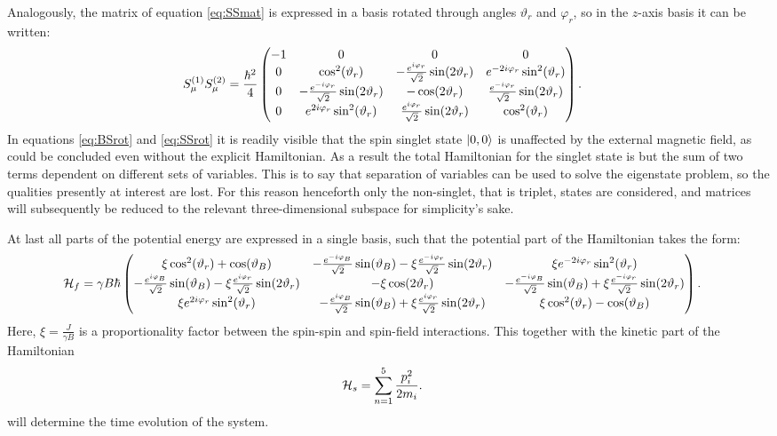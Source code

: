 \documentclass[a4paper]{article}
\begin{document}
Analogously, the matrix of equation \ref{eq:SSmat} is expressed in a basis rotated through
angles \(\vartheta_r\) and \(\varphi_r\), so in the \(z\)-axis basis it can be written:
\begin{align}\label{eq:SSrot}
        S^{(1)}_\mu S^{(2)}_\mu &= \frac{\hbar{}^2}{4}\pmqty{-1 & 0 & 0 & 0\\
                0 & \cos[2](\vartheta_r) & -\frac{e^{i\varphi_r}}{\sqrt{2}
                }\sin(2\vartheta_r) & e^{-2i\varphi_r}\sin[2](\vartheta_r)\\
                0 & -\frac{e^{-i\varphi_r}}{\sqrt{2}
                }\sin(2\vartheta_r) & -\cos(2\vartheta_r) & \frac{e^{-i\varphi_r}}{\sqrt{2}
        }\sin(2\vartheta_r)\\
        0 & e^{2i\varphi_r}\sin[2](\vartheta_r) & \frac{e^{i\varphi_r}}{\sqrt{2}
        }\sin(2\vartheta_r) & \cos[2](\vartheta_r)}
.\end{align}
In equations \ref{eq:BSrot} and \ref{eq:SSrot} it is readily visible that the spin singlet state \(\ket{0, 0}\) is unaffected by
the external magnetic field, as could be concluded even without the explicit Hamiltonian.
As a result the total Hamiltonian for the singlet state is but the sum of two terms
dependent on different sets of variables. This is to say that separation of variables can
be used to solve the eigenstate problem, so the qualities presently at interest are lost.
For this reason henceforth only the non-singlet, that is triplet, states are considered,
and matrices will subsequently be reduced to the relevant three-dimensional subspace for
simplicity's sake.

At last all parts of the potential energy are expressed in a single basis, such that the
potential part of the Hamiltonian takes the form:
\begin{align}\label{eq:Hf}
        \mathbb{\cal H}_f &= \gamma B \hbar{} \pmqty{
                 \xi\cos[2](\vartheta_r) + \cos(\vartheta_B)& -\frac{
                        e^{-i\varphi_B}}{\sqrt{2}
                }\sin(\vartheta_B) - \xi\frac{e^{-i\varphi_r}}{\sqrt{2} }\sin(2\vartheta_r) &
                \xi e^{-2i\varphi_r}\sin[2](\vartheta_r)\\
                 -\frac{e^{i\varphi_B}}{\sqrt{2}}\sin(\vartheta_B) -
                \xi \frac{e^{i\varphi_r}}{\sqrt{2} }\sin(2\vartheta_r) &
                -\xi\cos(2\vartheta_r) & -\frac{
                e^{-i\varphi_B}}{\sqrt{2} }\sin(\vartheta_B)+ \xi\frac{e^{-i\varphi_r}}{\sqrt{2}
        }\sin(2\vartheta_r)\\
                \xi e^{2i\varphi_r}\sin[2](\vartheta_r) & -\frac{
                e^{i\varphi_B}}{\sqrt{2} }\sin(\vartheta_B) +
                        \xi \frac{e^{i\varphi_r}}{\sqrt{2} }\sin(2\vartheta_r) &
                        \xi \cos[2](\vartheta_r) - \cos(\vartheta_B) 
        }
.\end{align}
Here, \(\xi = \frac{J}{\gamma B}\) is a proportionality factor between the spin-spin
and spin-field interactions. This together with the
kinetic part of the Hamiltonian
\begin{align}\label{eq:Hs}
        \mathbb{\cal H}_s &= \sum_{n=1}^{5} \frac{p_i^2}{2m_i}
.\end{align}
will determine the time evolution of the system.
\end{document}
